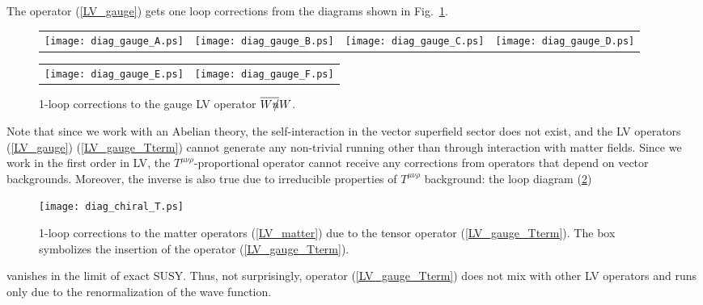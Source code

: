 \documentclass[paper,12pt]{revtex4}
\newcommand{\slashed}[1]{\hbox{{$#1$}\llap{$/$}}}
\begin{document}
The operator (\ref{LV_gauge}) gets one loop corrections from 
	the diagrams shown in 
Fig.~\ref{diag_LV_gauge}.
\begin{figure}[h]
\caption{\label{diag_LV_gauge}
        1-loop corrections to the gauge LV operator 
	$ \overline{W\slashed{n}} W $.
}
\begin{center}
\begin{tabular}{cccc}
\texttt{[image: diag\_gauge\_A.ps]}
&
\texttt{[image: diag\_gauge\_B.ps]}
&
\texttt{[image: diag\_gauge\_C.ps]} 
&
\texttt{[image: diag\_gauge\_D.ps]}
\end{tabular}
\begin{tabular}{cc}
\texttt{[image: diag\_gauge\_E.ps]}
&
\texttt{[image: diag\_gauge\_F.ps]}
\end{tabular}
\end{center}
\end{figure}
	Note that since we work with an Abelian theory, the self-interaction 
    in the vector superfield sector does not exist, and the LV operators (\ref{LV_gauge})
	(\ref{LV_gauge_Tterm}) cannot generate any non-trivial running other than 
through interaction with matter fields.
	Since we work in the first order in LV, the $ T^{\mu\nu\rho} $-proportional 
	operator cannot receive any corrections from operators that depend 
	on vector backgrounds. Moreover, the inverse is also true due to irreducible 
	properties of $ T^{\mu\nu\rho} $ background: the loop diagram (\ref{diag_LV_gauge_Tterm})
    \begin{figure}[h]
\caption{\label{diag_LV_gauge_Tterm}
        1-loop corrections to the matter operators (\ref{LV_matter})
	due to the tensor operator (\ref{LV_gauge_Tterm}).
	The box symbolizes the insertion of the operator
	(\ref{LV_gauge_Tterm}).
}
\begin{center}
\texttt{[image: diag\_chiral\_T.ps]}
\end{center}
\end{figure}
	vanishes in the limit of exact SUSY. Thus, not surprisingly,  
     operator (\ref{LV_gauge_Tterm})
    does not mix with other LV operators and
	runs only due to the renormalization of the wave function. 
	
\end{document}
